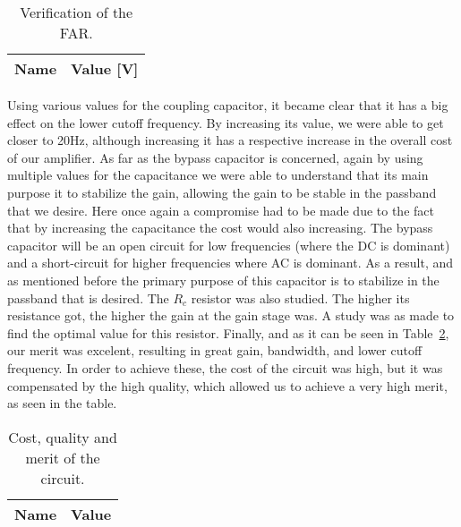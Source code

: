 \begin{table}[H]
 \centering
 \begin{tabular}{|l|r|}
 \hline
 {\bf Name} & {\bf Value [V]} \\ \hline

 \end{tabular}
 \caption{Verification of the FAR.}
 \label{tab:forwardbias}
 \end{table}

Using various values for the coupling capacitor, it became clear that it has a big
effect on the lower cutoff frequency. By increasing its value, we were able to get
closer to 20Hz, although increasing it has a respective increase in the overall
cost of our amplifier.
As far as the bypass capacitor is concerned, again by using multiple values for
the capacitance we were able to understand that its main purpose it to stabilize
the gain, allowing the gain to be stable in the passband that we desire. Here once
again a compromise had to be made due to the fact that by increasing the
capacitance the cost would also increasing.
The bypass capacitor will be an open circuit for low frequencies (where the DC is
dominant) and a short-circuit for higher frequencies where AC is dominant. As a
result, and as mentioned before the primary purpose of this capacitor is to
stabilize in the passband that is desired.
The $R_c$ resistor was also studied. The higher its resistance got, the higher the
gain at the gain stage was. A study was as made to find the
optimal value for this resistor.
Finally, and as it can be seen in Table~\ref{tab:merit_spice}, our merit was excelent, resulting in great gain, bandwidth, and lower cutoff frequency. In order to achieve these, the cost of the circuit was high, but it was compensated by the high quality, which allowed us to achieve a very high merit, as seen in the table. 

\begin{table}[H]
 \centering
 \begin{tabular}{|l|r|}
 \hline
 {\bf Name} & {\bf Value} \\ \hline

 \end{tabular}
 \caption{Cost, quality and merit of the circuit.}
 \label{tab:merit_spice}
\end{table}

